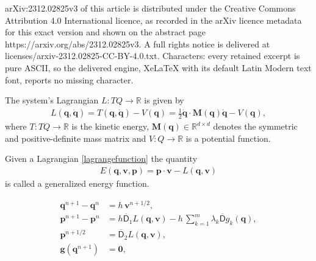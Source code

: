 \documentclass[10pt,a4paper]{amsart}
\newcommand{\DG}{\overline{\mathsf{D}}}
\newcommand{\npeh}{^{n+1/2}}
\newcommand{\npe}{^{n+1}}
\newcommand{\n}{^{n}}
\renewcommand{\vec}[1]{\ensuremath{\mbox{$\mathbf{#1}$}}}
\begin{document}
arXiv:2312.02825v3 of this article is distributed under the Creative Commons Attribution 4.0 International licence, as recorded in the arXiv licence metadata for this exact version and shown on the abstract page https://arxiv.org/abs/2312.02825v3. A full rights notice is delivered at licenses/arxiv-2312.02825-CC-BY-4.0.txt. Characters: every retained excerpt is pure ASCII, so the delivered engine, XeLaTeX with its default Latin Modern text font, reports no missing character.
\begin{definition}
    The system's Lagrangian $L \colon TQ \to \mathbb{R}$ is given by
    \begin{align}
        L(\vec{q},\dot{\vec{q}}) = T(\vec{q},\dot{\vec{q}}) - V(\vec{q}) = \frac{1}{2} \dot{\vec{q}} \cdot \vec{M}(\vec{q}) \dot{\vec{q}} -V(\vec{q}), \label{lagrangefunction}
    \end{align}
    where $T:TQ \rightarrow \mathbb{R}$ is the kinetic energy, $\vec{M}(\vec{q}) \in \mathbb{R}^{d \times d}$ denotes the symmetric and positive-definite mass matrix and $V: Q \rightarrow \mathbb{R}$ is a potential function.
\end{definition}

\begin{definition}
    Given a Lagrangian \eqref{lagrangefunction} the quantity
    \begin{align}
        E(\vec{q},\vec{v},\vec{p}) = \vec{p} \cdot \vec{v} - L(\vec{q},\vec{v}) \label{generalized_energy}
    \end{align}
    is called a generalized energy function.
\end{definition}

\begin{subequations}
    \label{HP_EL_discrete}
    \begin{align}
        \vec{q}\npe - \vec{q}\n & = h \, \vec{v}\npeh \label{HP_EL1_discrete} ,                                                           \\
        \vec{p}\npe - \vec{p}\n & = h \DG_1 L(\vec{q},\vec{v})  \label{HP_EL2_discrete} - h\, \sum_{k=1}^{m} \lambda_k \DG g_k(\vec{q}) , \\
        \vec{p}\npeh            & = \DG_2 L(\vec{q},\vec{v}) \label{HP_EL3_discrete} ,                                                    \\
        \vec{g}(\vec{q}\npe)    & = \vec{0} \label{HP_EL4_discrete} ,
    \end{align}
\end{subequations}
\end{document}
